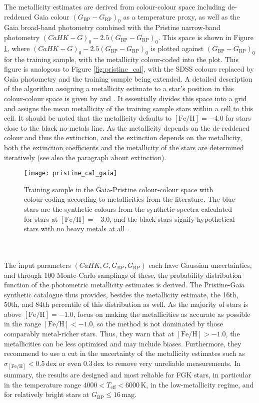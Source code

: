 \documentclass[a4paper,11pt]{article}
\begin{document}
%
The metallicity estimates are derived from colour-colour space including de-reddened Gaia colour $(G_\mathrm{BP}-G_\mathrm{RP})_0$ as a temperature proxy, as well as the Gaia broad-band photometry combined with the Pristine narrow-band photometry $(CaHK-G)_0-2.5(G_\mathrm{BP}-G_\mathrm{RP})_0$. This space is shown in Figure \ref{fig:pristine_cal_gaia}, where $(CaHK-G)_0-2.5(G_\mathrm{BP}-G_\mathrm{RP})_0$ is plotted against $(G_\mathrm{BP}-G_\mathrm{RP})_0$ for the training sample, with the metallicity colour-coded into the plot. This figure is analogous to Figure \ref{fig:pristine_cal}, with the SDSS colours replaced by Gaia photometry and the training sample being extended. A detailed description of the algorithm assigning a metallicity estimate to a star's position in this colour-colour space is given by \citet{pristine} and \citet{fernandez21}. It essentially divides this space into a grid and assigns the mean metallicity of the training sample stars within a cell to this cell. It should be noted that the metallicity defaults to $\mathrm{[Fe/H]}=-4.0$ for stars close to the black no-metals line. As the metallicity depends on the de-reddened colour and thus the extinction, and the extinction depends on the metallicity, both the extinction coefficients and the metallicity of the stars are determined iteratively (see also the paragraph about extinction).
%
\begin{figure}
 \centering
 \texttt{[image: pristine\_cal\_gaia]}
 \caption[Gaia-Pristine colour-colour space]{Training sample in the Gaia-Pristine colour-colour space with colour-coding according to metallicities from the literature. The blue stars are the synthetic colours from the synthetic spectra calculated for stars at $\mathrm{[Fe/H]}=-3.0$, and the black stars signify hypothetical stars with no heavy metals at all \citep{pristinegaia}.}
 \label{fig:pristine_cal_gaia}
\end{figure}\\ \\
%
The input parameters $(CaHK,G,G_\mathrm{BP},G_\mathrm{RP})$ each have Gaussian uncertainties, and through 100 Monte-Carlo samplings of these, the probability distribution function of the photometric metallicity estimates is derived. The Pristine-Gaia synthetic catalogue thus provides, besides the metallicity estimate, the 16th, 50th, and 84th percentile of this distribution as well. As the majority of stars is above $\mathrm{[Fe/H]}=-1.0$, \citet{pristinegaia} focus on making the metallicities as accurate as possible in the range $\mathrm{[Fe/H]}<-1.0$, so the method is not dominated by those comparably metal-richer stars. Thus, they warn that at $\mathrm{[Fe/H]}>-1.0$, the metallicities can be less optimised and may include biases. Furthermore, they recommend to use a cut in the uncertainty of the metallicity estimates such as $\sigma_\mathrm{[Fe/H]}<0.5$\,dex or even $0.3$\,dex to remove very unreliable measurements. In summary, the results are designed and most reliable for FGK stars, in particular in the temperature range $4000<T_\mathrm{eff}<6000$\,K, in the low-metallicity regime, and for relatively bright stars at $G_\mathrm{BP}\leq16$\,mag.
%
\end{document}
